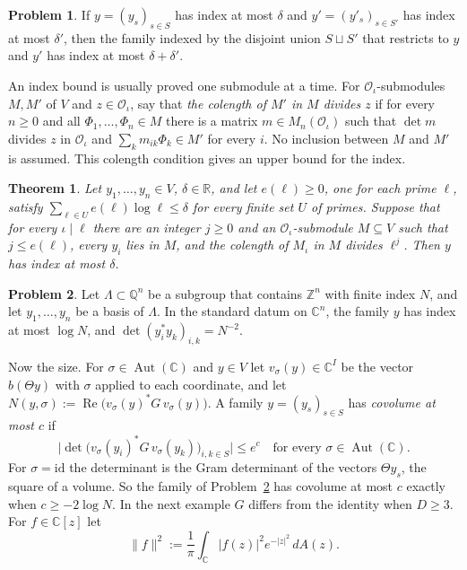 \documentclass[reqno]{amsart}
\theoremstyle{definition}
\newtheorem{problem}{Problem}[section]
\theoremstyle{plain}
\newtheorem{theorem}{Theorem}[section]
\newcommand{\Z}{\mathbb{Z}}
\newcommand{\Q}{\mathbb{Q}}
\newcommand{\R}{\mathbb{R}}
\newcommand{\C}{\mathbb{C}}
\newcommand{\Oc}{\mathcal{O}}
\newcommand{\Aut}{\operatorname{Aut}}
\begin{document}
\begin{problem}\label{pr:index-sum}
If \(y = (y_s)_{s \in S}\) has index at most \(\delta\) and \(y' = (y'_s)_{s \in S'}\) has index at most \(\delta'\), then the family indexed by the disjoint union \(S \sqcup S'\) that restricts to \(y\) and \(y'\) has index at most \(\delta + \delta'\).
\end{problem}

An index bound is usually proved one submodule at a time.  For \(\Oc_\iota\)-submodules \(M, M'\) of \(V\) and \(z \in \Oc_\iota\), say that \emph{the colength of \(M'\) in \(M\) divides \(z\)} if for every \(n \ge 0\) and all \(\Phi_1, \dots, \Phi_n \in M\) there is a matrix \(m \in M_n(\Oc_\iota)\) such that \(\det m\) divides \(z\) in \(\Oc_\iota\) and \(\sum_k m_{ik} \Phi_k \in M'\) for every \(i\).  No inclusion between \(M\) and \(M'\) is assumed.  This colength condition gives an upper bound for the index.

\begin{theorem}\label{thm:colength}
Let \(y_1, \dots, y_n \in V\), \(\delta \in \R\), and let \(e(\ell) \ge 0\), one for each prime \(\ell\), satisfy \(\sum_{\ell \in U} e(\ell) \log \ell \le \delta\) for every finite set \(U\) of primes.  Suppose that for every \(\iota \mid \ell\) there are an integer \(j \ge 0\) and an \(\Oc_\iota\)-submodule \(M \subseteq V\) such that \(j \le e(\ell)\), every \(y_i\) lies in \(M\), and the colength of \(M_\iota\) in \(M\) divides \(\ell^j\).  Then \(y\) has index at most \(\delta\).
\end{theorem}

\begin{problem}\label{pr:lattice-change}
Let \(\Lambda \subset \Q^n\) be a subgroup that contains \(\Z^n\) with finite index \(N\), and let \(y_1, \dots, y_n\) be a basis of \(\Lambda\).  In the standard datum on \(\C^n\), the family \(y\) has index at most \(\log N\), and \(\det(y_i^* y_k)_{i,k} = N^{-2}\).
\end{problem}

Now the size.  For \(\sigma \in \Aut(\C)\) and \(y \in V\) let \(v_\sigma(y) \in \C^I\) be the vector \(b(\Theta y)\) with \(\sigma\) applied to each coordinate, and let \(N(y, \sigma) := \operatorname{Re}\bigl(v_\sigma(y)^* G\, v_\sigma(y)\bigr)\).  A family \(y = (y_s)_{s \in S}\) has \emph{covolume at most \(c\)} if
\[
  \bigl\lvert \det\bigl( v_\sigma(y_i)^* G\, v_\sigma(y_k) \bigr)_{i,k \in S} \bigr\rvert \le e^c \quad\text{for every } \sigma \in \Aut(\C).
\]
For \(\sigma = \mathrm{id}\) the determinant is the Gram determinant of the vectors \(\Theta y_s\), the square of a volume.  So the family of Problem~\ref{pr:lattice-change} has covolume at most \(c\) exactly when \(c \ge -2\log N\).  In the next example \(G\) differs from the identity when \(D \ge 3\).  For \(f \in \C[z]\) let
\[
  \lVert f \rVert^2 := \frac{1}{\pi} \int_\C \lvert f(z) \rvert^2 e^{-\lvert z \rvert^2} \, d A(z) .
\]
\end{document}
